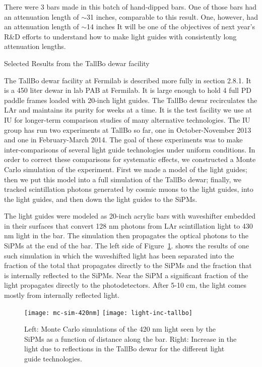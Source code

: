 There were 3 bars made in this batch of hand-dipped bars.  One of
those bars had an attenuation length of $\sim$31 inches, comparable to
this result.  One, however, had an attenuation length of $\sim$14
inches It will be one of the objectives of next year's R\&D efforts to
understand how to make light guides with consistently long attenuation
lengths.
 
Selected Results from the TallBo dewar facility

The TallBo dewar facility at Fermilab is described more fully in
section 2.8.1.  It is a 450 liter dewar in lab PAB at Fermilab.  It is
large enough to hold 4 full PD paddle frames loaded with 20-inch light
guides.  The TallBo dewar recirculates the LAr and maintains its
purity for weeks at a time.  It is the test facility we use at IU for
longer-term comparison studies of many alternative technologies.  The
IU group has run two experiments at TallBo so far, one in
October-November 2013 and one in February-March 2014.  The goal of
these experiments was to make inter-comparisons of several light guide
technologies under uniform conditions.  In order to correct these
comparisons for systematic effects, we constructed a Monte Carlo
simulation of the experiment.  First we made a model of the light
guides; then we put this model into a full simulation of the TallBo
dewar; finally, we tracked scintillation photons generated by cosmic
muons to the light guides, into the light guides, and then down the
light guides to the SiPMs.

The light guides were modeled as 20-inch acrylic bars with waveshifter
embedded in their surfaces that convert 128 nm photons from LAr
scintillation light to 430 nm light in the bar.  The simulation then
propagates the optical photons to the SiPMs at the end of the bar.
The left side of Figure~\ref{fig:mc-sim-and-tallbo}. shows the results
of one such simulation in which the waveshifted light has been
separated into the fraction of the total that propagates directly to
the SiPMs and the fraction that is internally reflected to the SiPMs.
Near the SiPM a significant fraction of the light propagates directly
to the photodetectors.  After 5-10 cm, the light comes mostly from
internally reflected light.

\begin{figure}[htbp]
\centering
\texttt{[image: mc-sim-420nm]}
\texttt{[image: light-inc-tallbo]}
\caption{Left: Monte Carlo simulations of the 420 nm light seen by the SiPMs as a function of distance along the bar. Right: Increase in the light due to reflections in the TallBo dewar for the different light guide technologies. }
\label{fig:mc-sim-and-tallbo}
\end{figure}

